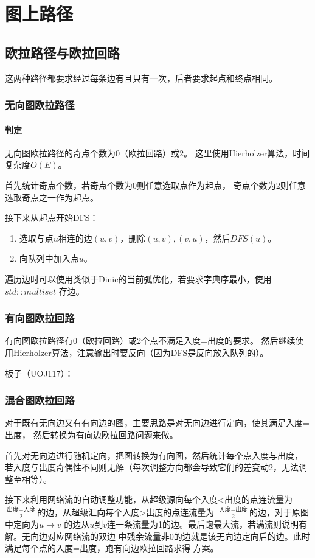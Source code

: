 \section{图上路径}
\subsection{欧拉路径与欧拉回路}
这两种路径都要求经过每条边有且只有一次，后者要求起点和终点相同。
\subsubsection{无向图欧拉路径}
\paragraph{判定} 无向图欧拉路径的奇点个数为0（欧拉回路）或2。
这里使用Hierholzer算法，时间复杂度$O(E)$。

首先统计奇点个数，若奇点个数为0则任意选取点作为起点，
奇点个数为2则任意选取奇点之一作为起点。

接下来从起点开始DFS：
\begin{enumerate}
    \item 选取与点$u$相连的边$(u,v)$，删除$(u,v),(v,u)$，然后$DFS(u)$。
    \item 向队列中加入点$u$。
\end{enumerate}
遍历边时可以使用类似于Dinic的当前弧优化，若要求字典序最小，使用$std::multiset$
存边。
\subsubsection{有向图欧拉回路}
有向图欧拉路径有0（欧拉回路）或2个点不满足入度=出度的要求。
然后继续使用Hierholzer算法，注意输出时要反向（因为DFS是反向放入队列的）。

板子（UOJ117）：

\subsubsection{混合图欧拉回路}
对于既有无向边又有有向边的图，主要思路是对无向边进行定向，使其满足入度=出度，
然后转换为有向边欧拉回路问题来做。

首先对无向边进行随机定向，把图转换为有向图，然后统计每个点入度与出度，
若入度与出度奇偶性不同则无解（每次调整方向都会导致它们的差变动2，无法调整至相等）。

接下来利用网络流的自动调整功能，从超级源向每个入度<出度的点连流量为
$\frac{\textrm{出度}-\textrm{入度}}{2}$的边，从超级汇向每个入度>出度的点连流量为
$\frac{\textrm{入度}-\textrm{出度}}{2}$的边，对于原图中定向为$u\rightarrow v$
的边从$u$到$v$连一条流量为1的边。最后跑最大流，若满流则说明有解。无向边对应网络流的双边
中残余流量非0的边就是该无向边定向后的边。此时满足每个点的入度=出度，跑有向边欧拉回路求得
方案。

